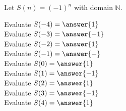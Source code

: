 \documentclass{ximera}
\author{Lee Wayand}
\begin{document}
\begin{exercise}



Let $S(n) = (-1)^n$ with domain $\mathbb{N}$.


\begin{question}


Evaluate $S(-4) = \answer{1}$ \\


Evaluate $S(-3) = \answer{-1}$ \\


Evaluate $S(-2) = \answer{1}$ \\


Evaluate $S(-1) = \answer{-}$ \\


Evaluate $S(0) = \answer{1}$ \\


Evaluate $S(1) = \answer{-1}$ \\


Evaluate $S(2) = \answer{1}$ \\


Evaluate $S(3) = \answer{-1}$ \\


Evaluate $S(4) = \answer{1}$ \\

\end{question}




\end{exercise}
\end{document}
